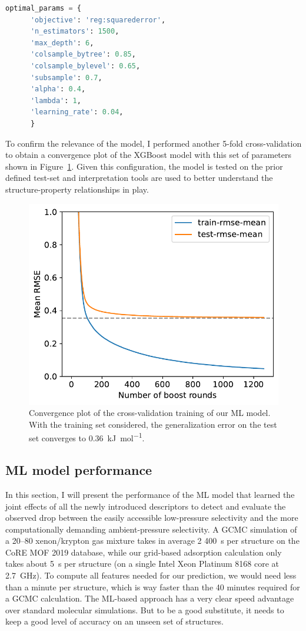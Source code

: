 \documentclass[main]{subfiles}
\begin{document}
\begin{lstlisting}[language=Python]
  optimal_params = {
      'objective': 'reg:squarederror',
      'n_estimators': 1500,
      'max_depth': 6,
      'colsample_bytree': 0.85,
      'colsample_bylevel': 0.65,
      'subsample': 0.7,
      'alpha': 0.4,
      'lambda': 1,
      'learning_rate': 0.04,
      }
  \end{lstlisting}

To confirm the relevance of the model, I performed another 5-fold cross-validation to obtain a convergence plot of the XGBoost model with this set of parameters shown in Figure~\ref{fgr:convplot}. Given this configuration, the model is tested on the prior defined test-set and interpretation tools are used to better understand the structure-property relationships in play.

\begin{figure}[ht]
  \centering
    \includegraphics[width=0.60\linewidth]{figures/4-ml/SI_figure/convergence_plot.pdf}
    \caption{Convergence plot of the cross-validation training of our ML model. With the training set considered, the generalization error on the test set converges to 0.36~\si{\kilo\joule\per\mole}.}\label{fgr:convplot}
  \end{figure}

\subsection{ML model performance}

In this section, I will present the performance of the ML model that learned the joint effects of all the newly introduced descriptors to detect and evaluate the observed drop between the easily accessible low-pressure selectivity and the more computationally demanding ambient-pressure selectivity.
A GCMC simulation of a 20–80 xenon/krypton gas mixture takes in average 2 400~\si{\second} per structure on the CoRE MOF 2019 database, while our grid-based adsorption calculation only takes about \SI{5}{\second} per structure (on a single Intel Xeon Platinum 8168 core at \SI{2.7}{\giga\hertz}). To compute all features needed for our prediction, we would need less than a minute per structure, which is way faster than the 40 minutes required for a GCMC calculation. The ML-based approach has a very clear speed advantage over standard molecular simulations. But to be a good substitute, it needs to keep a good level of accuracy on an unseen set of structures.
\end{document}
